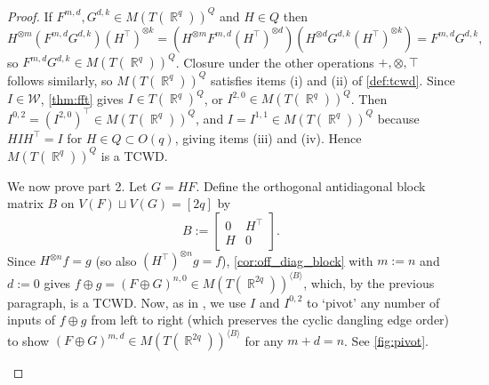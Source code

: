 \documentclass{article}
\theoremstyle{remark}
\theoremstyle{definition}
\DeclareMathOperator{\rr}{\mathbb{R}}
\DeclareMathOperator{\vx}{\mathbf{x}}
\begin{document}
\begin{proof}
    If $F^{m,d},G^{d,k} \in M(T(\rr^q))^Q$ and $H \in Q$ then
    \[
        H^{\otimes m} (F^{m,d} G^{d,k}) (H^\top)^{\otimes k} = 
        (H^{\otimes m} F^{m,d} (H^\top)^{\otimes d}) (H^{\otimes d} G^{d,k} (H^\top)^{\otimes k})
        = F^{m,d} G^{d,k},
    \]
    so $F^{m,d}G^{d,k} \in M(T(\rr^q))^Q$. Closure under the other operations $+, \otimes, \top$
    follows similarly, so $M(T(\rr^q))^Q$ satisfies items (i) and (ii) of \autoref{def:tcwd}.
    Since $I \in \mathcal{W}$, \autoref{thm:fft} gives $I \in T(\rr^q)^Q$, or
    $I^{2,0} \in M(T(\rr^q))^Q$. Then $I^{0,2} = (I^{2,0})^\top \in M(T(\rr^q))^Q$,
    and $I = I^{1,1} \in M(T(\rr^q))^Q$ because $HIH^\top = I$ for $H \in Q \subset
    O(q)$, giving items (iii) and (iv). Hence $M(T(\rr^q))^Q$ is a TCWD. 

    We now prove part 2.
    Let $G = HF$. Define the orthogonal antidiagonal block matrix $B$ on $V(F) \sqcup V(G) = [2q]$ by
    \begin{equation}
        \label{eq:b}
        B := \begin{bmatrix} 0 & H^\top \\ H & 0 \end{bmatrix}.
    \end{equation}
    Since $H^{\otimes n} f = g$ (so also $(H^{\top})^{\otimes n}g = f$),
    \autoref{cor:off_diag_block} with $m:=n$ and $d:=0$ gives
    $f \oplus g = (F \oplus G)^{n,0} \in M(T(\rr^{2q}))^{\langle B\rangle}$, which, by the previous paragraph, is a TCWD.
    Now, as in \cite[Lemma 3]{cai_planar_2023}, we use $I$ and $I^{0,2}$ to `pivot' any number of
    inputs of $f \oplus g$ from left to right 
    (which preserves the cyclic dangling edge order) to show 
    $(F \oplus G)^{m,d} \in M(T(\rr^{2q}))^{\langle B \rangle}$ for any $m+d=n$. See \autoref{fig:pivot}.
    \begin{figure}[ht!]
        \centering
\end{figure}
\end{proof}
\end{document}
